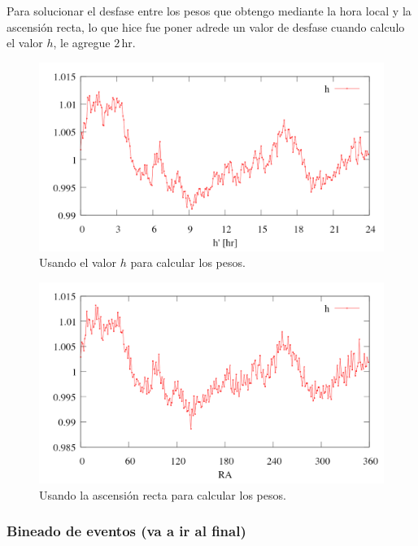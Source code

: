 		Para solucionar el desfase entre los pesos que obtengo mediante la hora local y la ascensión recta, lo que hice fue poner adrede un valor de desfase cuando calculo el valor $h$, le agregue $2\,$hr. 
		
		\begin{figure}[H]
			\centering
			\includegraphics[width=\linewidth]{eventos_hora_local.png}
			\caption{Usando el valor $h$ para calcular los pesos.}
		\end{figure}
		
		
		\begin{figure}[H]
			\centering
			\includegraphics[width=\linewidth]{eventos_RA.png}
			\caption{Usando la ascensión recta para calcular los pesos.}
		\end{figure}
		

	\subsubsection{Bineado de eventos  (va a ir al final)}

